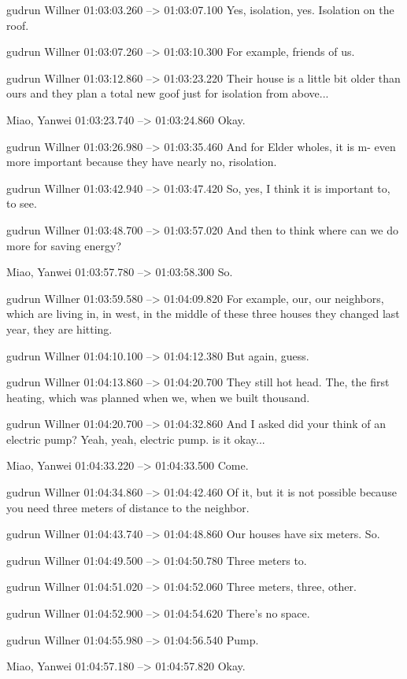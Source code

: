 {gudrun Willner 01:03:03.260 --> 01:03:07.100
Yes, isolation, yes. Isolation on the roof.

gudrun Willner 01:03:07.260 --> 01:03:10.300
For example, friends of us.

gudrun Willner 01:03:12.860 --> 01:03:23.220
Their house is a little bit older than ours and they plan a total new goof just for isolation from above...

Miao, Yanwei 01:03:23.740 --> 01:03:24.860
Okay.

gudrun Willner 01:03:26.980 --> 01:03:35.460
And for Elder wholes, it is m- even more important because they have nearly no, risolation.

gudrun Willner 01:03:42.940 --> 01:03:47.420
So, yes, I think it is important to, to see.

gudrun Willner 01:03:48.700 --> 01:03:57.020
And then to think where can we do more for saving energy?

Miao, Yanwei 01:03:57.780 --> 01:03:58.300
So.

gudrun Willner 01:03:59.580 --> 01:04:09.820
For example, our, our neighbors, which are living in, in west, in the middle of these three houses they changed last year, they are hitting.

gudrun Willner 01:04:10.100 --> 01:04:12.380
But again, guess.

gudrun Willner 01:04:13.860 --> 01:04:20.700
They still hot head. The, the first heating, which was planned when we, when we built thousand.

gudrun Willner 01:04:20.700 --> 01:04:32.860
And I asked did your think of an electric pump? Yeah, yeah, electric pump. is it okay...

Miao, Yanwei 01:04:33.220 --> 01:04:33.500
Come.

gudrun Willner 01:04:34.860 --> 01:04:42.460
Of it, but it is not possible because you need three meters of distance to the neighbor.

gudrun Willner 01:04:43.740 --> 01:04:48.860
Our houses have six meters. So.

gudrun Willner 01:04:49.500 --> 01:04:50.780
Three meters to.

gudrun Willner 01:04:51.020 --> 01:04:52.060
Three meters, three, other.

gudrun Willner 01:04:52.900 --> 01:04:54.620
There's no space.

gudrun Willner 01:04:55.980 --> 01:04:56.540
Pump.

Miao, Yanwei 01:04:57.180 --> 01:04:57.820
Okay.

}
